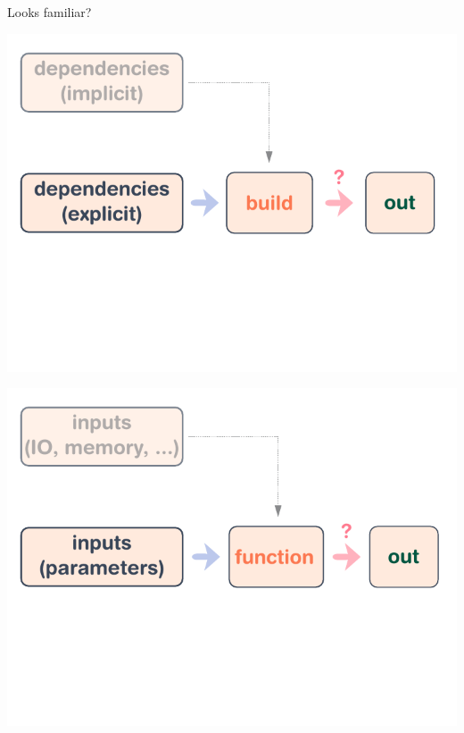 \documentclass[aspectratio=169]{beamer}
\begin{document}
\begin{frame}{Looks familiar?}
     {
        \begin{center}
            \includegraphics[height=0.98\textheight]{img/schema-build-simplified.pdf}
        \end{center}
    }
     {
        \begin{center}
            \includegraphics[height=0.98\textheight]{img/schema-build-functional.pdf}
        \end{center}
    }
\end{frame}
\end{document}
